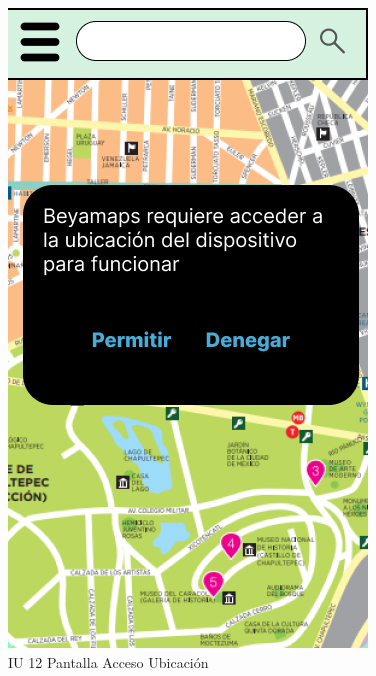 \begin{figure}[h]
\begin{minipage}{0.5\textwidth}
        \includegraphics[width=.7\linewidth]{Pantallas Prototipo3/IU12 Pantalla Acceso Ubicacion.jpg}
        \caption{IU 12 Pantalla Acceso Ubicación}
    \end{minipage}%
\end{figure}

